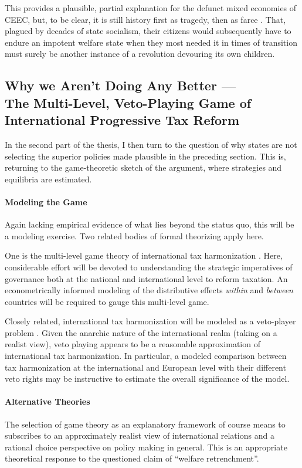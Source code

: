 This provides a plausible, partial explanation for the defunct mixed economies of \gls{CEEC}, but, to be clear, it is still history first as tragedy, then as farce \citep{Marx1852}.
That, plagued by decades of state socialism, their citizens would subsequently have to endure an impotent welfare state when they most needed it in times of transition must surely be another instance of a revolution devouring its own children.


\subsection{Why we Aren't Doing Any Better ---\\The Multi-Level, Veto-Playing Game of International Progressive Tax Reform}

In the second part of the thesis, I then turn to the question of why states are not selecting the superior policies made plausible in the preceding section.
This is, returning to the game-theoretic sketch of the argument, where strategies and equilibria are estimated.

\paragraph{Modeling the Game}
Again lacking empirical evidence of what lies beyond the status quo, this will be a modeling exercise.
Two related bodies of formal theorizing apply here.

One is the multi-level game theory of international tax harmonization \citep{Scharpf-1997-aa}.
Here, considerable effort will be devoted to understanding the strategic imperatives of governance both at the national and international level to reform taxation.
An econometrically informed modeling of the distributive effects \emph{within} and \emph{between} countries will be required to gauge this multi-level game.

Closely related, international tax harmonization will be modeled as a veto-player problem \citep{Tsebelis-2002-aa}.
Given the anarchic nature of the international realm (taking on a realist view), veto playing appears to be a reasonable approximation of international tax harmonization.
In particular, a modeled comparison between tax harmonization at the international and European level with their different veto rights may be instructive to estimate the overall significance of the model.

\paragraph{Alternative Theories}
The selection of game theory as an explanatory framework of course means to subscribes to an approximately realist view of international relations and a rational choice perspective on policy making in general.
This is an appropriate theoretical response to the questioned claim of ``welfare retrenchment''.

